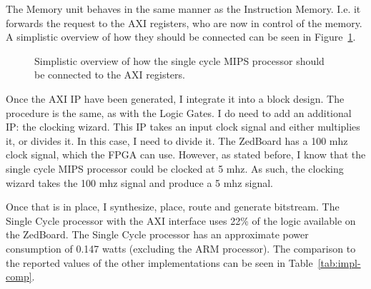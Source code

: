 The Memory unit behaves in the same manner as the Instruction Memory. I.e.
it forwards the request to the AXI registers, who are now in control of
the memory. A simplistic overview of how they should be connected can be seen
in Figure~\ref{fig:single-cycle-axi}.

\begin{figure}
    \centering
    \caption{Simplistic overview of how the single cycle MIPS processor should
    be connected to the AXI registers.}
    \label{fig:single-cycle-axi}
\end{figure}

Once the AXI IP have been generated, I integrate it into a block design.  The
procedure is the same, as with the Logic Gates. I do need to add an additional
IP: the clocking wizard. This IP takes an input clock signal and either
multiplies it, or divides it. In this case, I need to divide it. The ZedBoard
has a 100 mhz clock signal, which the FPGA can use. However, as stated before,
I know that the single cycle MIPS processor could be clocked at 5 mhz. As such,
the clocking wizard takes the 100 mhz signal and produce a 5 mhz signal.

Once that is in place, I synthesize, place, route and generate bitstream. The
Single Cycle processor with the AXI interface uses 22\% of the logic available
on the ZedBoard. The Single Cycle processor has an approximate power consumption
of 0.147 watts (excluding the ARM processor). The comparison to the reported
values of the other implementations can be seen in Table~\ref{tab:impl-comp}.

